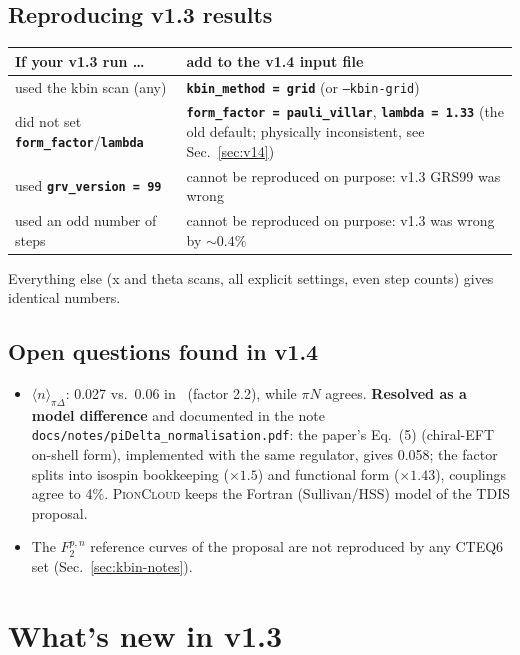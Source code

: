 \documentclass[11pt,a4paper]{article}
\newcommand{\picloud}{\textsc{PionCloud}}
\newcommand{\inikey}[1]{\texttt{\textbf{#1}}}
\begin{document}
\subsection{Reproducing v1.3 results}
\label{sec:migration}

\begin{center}
\begin{tabular}{p{5.2cm}p{9cm}}
\toprule
\textbf{If your v1.3 run \dots} & \textbf{add to the v1.4 input file} \\
\midrule
used the kbin scan (any) & \inikey{kbin\_method = grid} (or \texttt{--kbin-grid}) \\
did not set \inikey{form\_factor}/\inikey{lambda} & \inikey{form\_factor = pauli\_villar}, \inikey{lambda = 1.33}
  (the old default; physically inconsistent, see Sec.~\ref{sec:v14}) \\
used \inikey{grv\_version = 99} & cannot be reproduced on purpose: v1.3 GRS99 was wrong \\
used an odd number of steps & cannot be reproduced on purpose: v1.3 was wrong by $\sim0.4\%$ \\
\bottomrule
\end{tabular}
\end{center}
Everything else (x and theta scans, all explicit settings, even step counts)
gives identical numbers.

\subsection{Open questions found in v1.4}
\begin{itemize}
\item $\langle n\rangle_{\pi\Delta}$: 0.027 vs.\ 0.06 in~\cite{McK16}
  (factor 2.2), while $\pi N$ agrees.  \textbf{Resolved as a model
  difference} and documented in the note
  \texttt{docs/notes/piDelta\_normalisation.pdf}: the paper's Eq.~(5)
  (chiral-EFT on-shell form), implemented with the same regulator, gives
  0.058; the factor splits into isospin bookkeeping ($\times1.5$) and
  functional form ($\times1.43$), couplings agree to 4\%.  \picloud{} keeps
  the Fortran (Sullivan/HSS) model of the TDIS proposal.
\item The $F_2^{p,n}$ reference curves of the proposal are not reproduced by
  any CTEQ6 set (Sec.~\ref{sec:kbin-notes}).
\end{itemize}

\section{What's new in v1.3}
\end{document}
